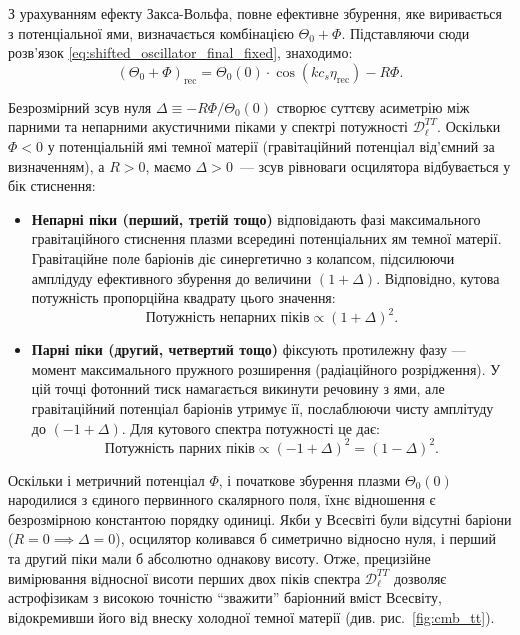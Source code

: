 З урахуванням ефекту Закса-Вольфа, повне ефективне збурення, яке виривається з потенціальної ями, визначається комбінацією $\Theta_0 + \Phi$. Підставляючи сюди розв'язок \eqref{eq:shifted_oscillator_final_fixed}, знаходимо:
\begin{equation}\label{eq:baryon_loading_shift_result}
    \left( \Theta_0 + \Phi \right)_{\mathrm{rec}} = \Theta_0(0)\cdot\cos\!\left(kc_s\eta_\text{rec}\right) - R\Phi.
\end{equation}

Безрозмірний зсув нуля $\Delta \equiv -R\Phi / \Theta_0(0)$
створює суттєву асиметрію між парними та непарними акустичними
піками у спектрі потужності $\mathcal{D}_\ell^{TT}$.
Оскільки $\Phi < 0$ у потенціальній ямі темної матерії
(гравітаційний потенціал від'ємний за визначенням), а $R > 0$,
маємо $\Delta > 0$~--- зсув рівноваги осцилятора відбувається
у бік стиснення:
\begin{itemize}
    \item \textbf{Непарні піки (перший, третій тощо)} відповідають фазі максимального гравітаційного стиснення плазми всередині потенціальних ям темної матерії. Гравітаційне поле баріонів діє синергетично з колапсом, підсилюючи амплідуду ефективного збурення до величини $(1+\Delta)$. Відповідно, кутова потужність пропорційна квадрату цього значення:
    \begin{equation}
        \text{Потужність непарних піків} \propto (1+\Delta)^2.
    \end{equation}

    \item \textbf{Парні піки (другий, четвертий тощо)} фіксують протилежну фазу --- момент максимального пружного розширення (радіаційного розрідження). У цій точці фотонний тиск намагається викинути речовину з ями, але гравітаційний потенціал баріонів утримує її, послаблюючи чисту амплітуду до $(-1+\Delta)$. Для кутового спектра потужності це дає:
    \begin{equation}
        \text{Потужність парних піків} \propto (-1+\Delta)^2 = (1-\Delta)^2.
    \end{equation}
\end{itemize}

Оскільки і метричний потенціал $\Phi$, і початкове збурення плазми $\Theta_0(0)$ народилися з єдиного первинного скалярного поля, їхнє відношення є безрозмірною константою порядку одиниці. Якби у Всесвіті були відсутні баріони ($R=0 \implies \Delta = 0$), осцилятор коливався б симетрично відносно нуля, і перший та другий піки мали б абсолютно однакову висоту. Отже, прецизійне вимірювання відносної висоти перших двох піків спектра $\mathcal{D}_\ell^{TT}$ дозволяє астрофізикам з високою точністю \enquote{зважити} баріонний вміст Всесвіту, відокремивши його від внеску холодної темної матерії (див. рис.~\ref{fig:cmb_tt}).

